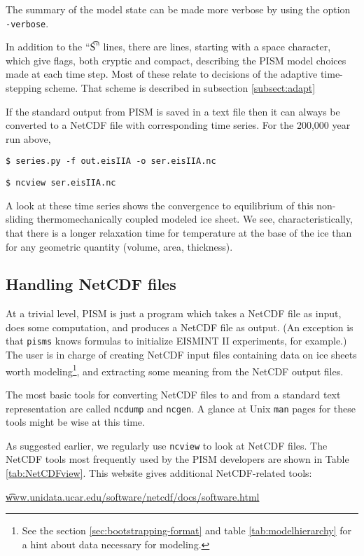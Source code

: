 The summary of the model state can be made more verbose by using the option \verb|-verbose|.  

In addition to the ``\t{S}'' lines, there are lines, starting with a space character, which give flags, both cryptic and compact, describing the PISM model choices made at each time step.  Most of these relate to decisions of the adaptive time-stepping scheme.  That scheme is described in subsection \ref{subsect:adapt}

If the standard output from PISM is saved in a text file then it can always be converted to a NetCDF file with corresponding time series.  For the 200,000 year run above,

\verb|$ series.py -f out.eisIIA -o ser.eisIIA.nc|

\verb|$ ncview ser.eisIIA.nc|

A look at these time series shows the convergence to equilibrium of this non-sliding thermomechanically coupled modeled ice sheet.  We see, characteristically, that there is a longer relaxation time for temperature at the base of the ice than for any geometric quantity (volume, area, thickness).

\subsection{Handling NetCDF files}\label{subsect:nctoolsintro}  At a trivial level, PISM is just a program which takes a NetCDF file as input, does some computation, and produces a NetCDF file as output.  (An exception is that \verb|pisms| knows formulas to initialize EISMINT II experiments, for example.)  The user is in charge of creating NetCDF input files containing data on ice sheets worth modeling\footnote{See the section \ref{sec:bootstrapping-format} and table \ref{tab:modelhierarchy} for a hint about data necessary for modeling.}, and extracting some meaning from the NetCDF output files.

The most basic tools for converting NetCDF files to and from a standard text representation are called \verb|ncdump| and \verb|ncgen|.  A glance at Unix \verb|man| pages for these tools might be wise at this time.

As suggested earlier, we regularly use \verb|ncview| to look at NetCDF files.  The NetCDF tools most frequently used by the PISM developers are shown in Table \ref{tab:NetCDFview}.  This website gives additional NetCDF-related tools:

\centerline{ \href{http://www.unidata.ucar.edu/software/netcdf/docs/software.html}{\t{www.unidata.ucar.edu/software/netcdf/docs/software.html}} } 

